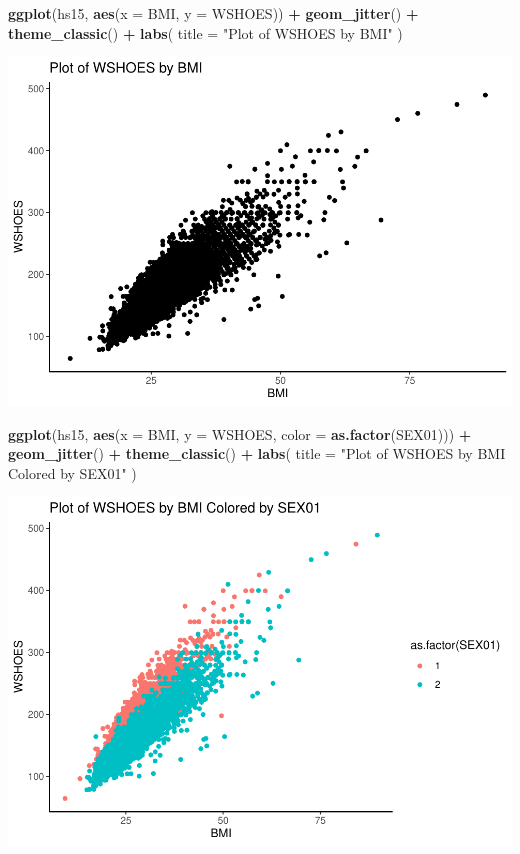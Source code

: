 \documentclass[]{article}
\newenvironment{Shaded}{\begin{snugshade}}{\end{snugshade}}
\newcommand{\DataTypeTok}[1]{\textcolor[rgb]{0.13,0.29,0.53}{#1}}
\newcommand{\KeywordTok}[1]{\textcolor[rgb]{0.13,0.29,0.53}{\textbf{#1}}}
\newcommand{\NormalTok}[1]{#1}
\newcommand{\OperatorTok}[1]{\textcolor[rgb]{0.81,0.36,0.00}{\textbf{#1}}}
\newcommand{\StringTok}[1]{\textcolor[rgb]{0.31,0.60,0.02}{#1}}
\begin{document}
\begin{Shaded}
\begin{Highlighting}[]
\KeywordTok{ggplot}\NormalTok{(hs15, }\KeywordTok{aes}\NormalTok{(}\DataTypeTok{x =}\NormalTok{ BMI, }\DataTypeTok{y =}\NormalTok{ WSHOES)) }\OperatorTok{+}
\StringTok{  }\KeywordTok{geom_jitter}\NormalTok{() }\OperatorTok{+}
\StringTok{  }\KeywordTok{theme_classic}\NormalTok{() }\OperatorTok{+}
\StringTok{  }\KeywordTok{labs}\NormalTok{(}
    \DataTypeTok{title =} \StringTok{"Plot of WSHOES by BMI"}
\NormalTok{  )}
\end{Highlighting}
\end{Shaded}

\includegraphics{assignment2_files/figure-latex/q7-5.pdf}

\begin{Shaded}
\begin{Highlighting}[]
\KeywordTok{ggplot}\NormalTok{(hs15, }\KeywordTok{aes}\NormalTok{(}\DataTypeTok{x =}\NormalTok{ BMI, }\DataTypeTok{y =}\NormalTok{ WSHOES, }\DataTypeTok{color =} \KeywordTok{as.factor}\NormalTok{(SEX01))) }\OperatorTok{+}
\StringTok{  }\KeywordTok{geom_jitter}\NormalTok{() }\OperatorTok{+}
\StringTok{  }\KeywordTok{theme_classic}\NormalTok{() }\OperatorTok{+}
\StringTok{  }\KeywordTok{labs}\NormalTok{(}
    \DataTypeTok{title =} \StringTok{"Plot of WSHOES by BMI Colored by SEX01"}
\NormalTok{  )}
\end{Highlighting}
\end{Shaded}

\includegraphics{assignment2_files/figure-latex/q7-6.pdf}
\end{document}
